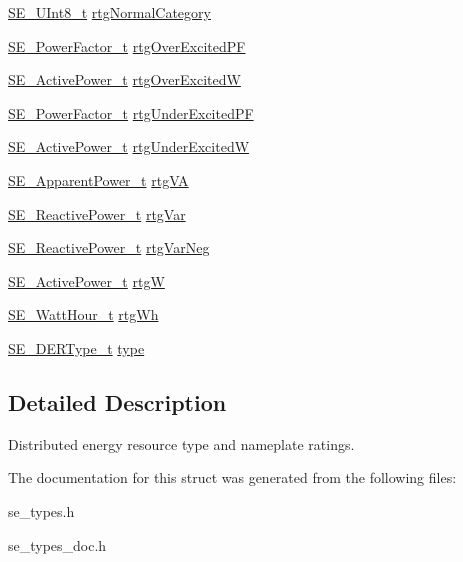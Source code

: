 \begin{DoxyCompactItemize}
\item 
\hyperlink{group__UInt8_gaf7c365a1acfe204e3a67c16ed44572f5}{S\+E\+\_\+\+U\+Int8\+\_\+t} \hyperlink{group__DERCapability_gacc4601c0a325f5ddfc49dfb2d8505fe6}{rtg\+Normal\+Category}
\item 
\hyperlink{structSE__PowerFactor__t}{S\+E\+\_\+\+Power\+Factor\+\_\+t} \hyperlink{group__DERCapability_ga09cc0b98cc28ab8552ef88162516fc1f}{rtg\+Over\+Excited\+PF}
\item 
\hyperlink{structSE__ActivePower__t}{S\+E\+\_\+\+Active\+Power\+\_\+t} \hyperlink{group__DERCapability_gaf00b204426202867e4ed034f24913df1}{rtg\+Over\+ExcitedW}
\item 
\hyperlink{structSE__PowerFactor__t}{S\+E\+\_\+\+Power\+Factor\+\_\+t} \hyperlink{group__DERCapability_gafec88a7d239a508cf8179da9c92c860f}{rtg\+Under\+Excited\+PF}
\item 
\hyperlink{structSE__ActivePower__t}{S\+E\+\_\+\+Active\+Power\+\_\+t} \hyperlink{group__DERCapability_ga0b291049be0af4e289aea080f700b22c}{rtg\+Under\+ExcitedW}
\item 
\hyperlink{structSE__ApparentPower__t}{S\+E\+\_\+\+Apparent\+Power\+\_\+t} \hyperlink{group__DERCapability_gac861791e43780c5ca7f9994c31f59e86}{rtg\+VA}
\item 
\hyperlink{structSE__ReactivePower__t}{S\+E\+\_\+\+Reactive\+Power\+\_\+t} \hyperlink{group__DERCapability_ga626f569c239b41de4d007fddb01de132}{rtg\+Var}
\item 
\hyperlink{structSE__ReactivePower__t}{S\+E\+\_\+\+Reactive\+Power\+\_\+t} \hyperlink{group__DERCapability_ga3bbef4aacb8b26a315f24bb5a9b26deb}{rtg\+Var\+Neg}
\item 
\hyperlink{structSE__ActivePower__t}{S\+E\+\_\+\+Active\+Power\+\_\+t} \hyperlink{group__DERCapability_gabb04b932aebcf4b908bee4d1e9b81f13}{rtgW}
\item 
\hyperlink{structSE__WattHour__t}{S\+E\+\_\+\+Watt\+Hour\+\_\+t} \hyperlink{group__DERCapability_gad7168b19a76c0dc8b404801be524bff4}{rtg\+Wh}
\item 
\hyperlink{group__DERType_gad0e420a05951a4331fb39782b428852f}{S\+E\+\_\+\+D\+E\+R\+Type\+\_\+t} \hyperlink{group__DERCapability_ga50fcc4caf19115d8398da27622a972c1}{type}
\end{DoxyCompactItemize}


\subsection{Detailed Description}
Distributed energy resource type and nameplate ratings. 

The documentation for this struct was generated from the following files\+:\begin{DoxyCompactItemize}
\item 
se\+\_\+types.\+h\item 
se\+\_\+types\+\_\+doc.\+h\end{DoxyCompactItemize}
